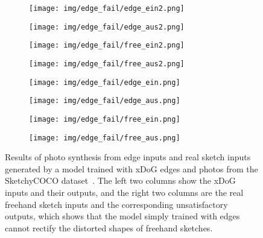 \documentclass[10pt,twocolumn,letterpaper]{article}
\begin{document}
\begin{figure}[tbp]
\captionsetup[subfigure]{labelformat=empty}
\begin{center}
  \begin{subfigure}[b]{0.23\linewidth}
  \texttt{[image: img/edge\_fail/edge\_ein2.png]}
  \end{subfigure}
  \begin{subfigure}[b]{0.23\linewidth}
  \texttt{[image: img/edge\_fail/edge\_aus2.png]}
  \end{subfigure}\hfill \begin{subfigure}[b]{0.23\linewidth}
  \texttt{[image: img/edge\_fail/free\_ein2.png]}
  \end{subfigure}
  \begin{subfigure}[b]{0.23\linewidth}
  \texttt{[image: img/edge\_fail/free\_aus2.png]}
  \end{subfigure}
  
  \begin{subfigure}[b]{0.23\linewidth}
  \texttt{[image: img/edge\_fail/edge\_ein.png]}
  \end{subfigure}
  \begin{subfigure}[b]{0.23\linewidth}
  \texttt{[image: img/edge\_fail/edge\_aus.png]}
  \end{subfigure}\hfill \begin{subfigure}[b]{0.23\linewidth}
  \texttt{[image: img/edge\_fail/free\_ein.png]}
  \end{subfigure}
  \begin{subfigure}[b]{0.23\linewidth}
  \texttt{[image: img/edge\_fail/free\_aus.png]}
  \end{subfigure}
\end{center}
\caption{Results of photo synthesis from edge inputs and real sketch inputs generated by a model trained with xDoG edges and photos from the SketchyCOCO dataset~\cite{gao2020sketchycoco}. The left two columns show the xDoG inputs and their outputs, and the right two columns are the real freehand sketch inputs and the corresponding unsatisfactory outputs, which shows that the model simply trained with edges cannot rectify the distorted shapes of freehand sketches. }
 \label{fig:edge_failed_sketch}
\end{figure}
\end{document}
